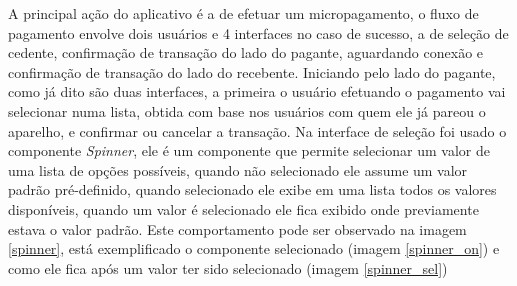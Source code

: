 \documentclass[hidelinks,12pt]{article}
\begin{document}
A principal a\c{c}\~ao do aplicativo \'e a de efetuar um micropagamento, o fluxo de pagamento envolve dois usu\'arios e 4 interfaces no caso de sucesso, a de sele\c{c}\~ao de cedente, confirma\c{c}\~ao de transa\c{c}\~ao do lado do pagante, aguardando conex\~ao e confirma\c{c}\~ao de transa\c{c}\~ao do lado do recebente.
Iniciando pelo lado do pagante, como j\'a dito s\~ao duas interfaces, a primeira o usu\'ario efetuando o pagamento vai selecionar numa lista, obtida com base nos usu\'arios com quem ele j\'a pareou o aparelho, e confirmar ou cancelar a transa\c{c}\~ao. Na interface de sele\c{c}\~ao foi usado o componente \textit{Spinner}, ele  \'e um componente que permite selecionar um valor de uma lista de op\c{c}\~oes poss\'iveis, quando n\~ao selecionado ele assume um valor padr\~ao pr\'e-definido, quando selecionado ele exibe em uma lista todos os valores dispon\'iveis, quando um valor \'e selecionado ele fica exibido onde previamente estava o valor padr\~ao. Este comportamento pode ser observado na imagem \ref{spinner}, está exemplificado o componente selecionado (imagem \ref{spinner_on}) e como ele fica após um valor ter sido selecionado (imagem \ref{spinner_sel})
\end{document}
